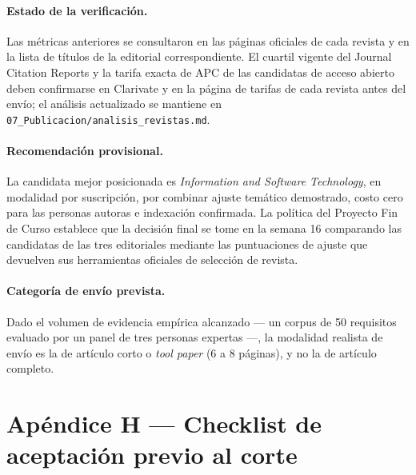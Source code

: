 \documentclass[journal,onecolumn]{IEEEtran}
\begin{document}
	\paragraph{Estado de la verificación.}
	Las métricas anteriores se consultaron en las páginas oficiales de cada
	revista y en la lista de títulos de la editorial correspondiente. El cuartil
	vigente del Journal Citation Reports y la tarifa exacta de APC de las
	candidatas de acceso abierto deben confirmarse en Clarivate y en la página de
	tarifas de cada revista antes del envío; el análisis actualizado se mantiene
	en \texttt{07\_Publicacion/analisis\_revistas.md}.
	
	\paragraph{Recomendación provisional.}
	La candidata mejor posicionada es \emph{Information and Software Technology},
	en modalidad por suscripción, por combinar ajuste temático demostrado, costo
	cero para las personas autoras e indexación confirmada. La política del
	Proyecto Fin de Curso establece que la decisión final se tome en la semana 16
	comparando las candidatas de las tres editoriales mediante las puntuaciones
	de ajuste que devuelven sus herramientas oficiales de selección de revista.
	
	\paragraph{Categoría de envío prevista.}
	Dado el volumen de evidencia empírica alcanzado --- un corpus de 50
	requisitos evaluado por un panel de tres personas expertas ---, la modalidad
	realista de envío es la de artículo corto o \emph{tool paper} (6 a 8
	páginas), y no la de artículo completo.
	
	\section*{Apéndice H --- Checklist de aceptación previo al corte}
	\label{ap:checklist}
	
\end{document}
